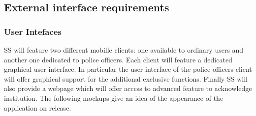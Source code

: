 \subsection{External interface requirements}
 
	\subsubsection{User Intefaces}
 		SS will feature two different mobille clients: one available to ordinary users and another one dedicated to police officers. Each client will feature a dedicated graphical user interface. \newline
	 In particular the user interface of the police officers client will offer  graphical support for the additional exclusive functions.\newline
		Finally SS will also provide a webpage which will offer access to advanced feature to acknowledge institution.\newline
		The following mockups give an idea of the appearance of the application on release.
